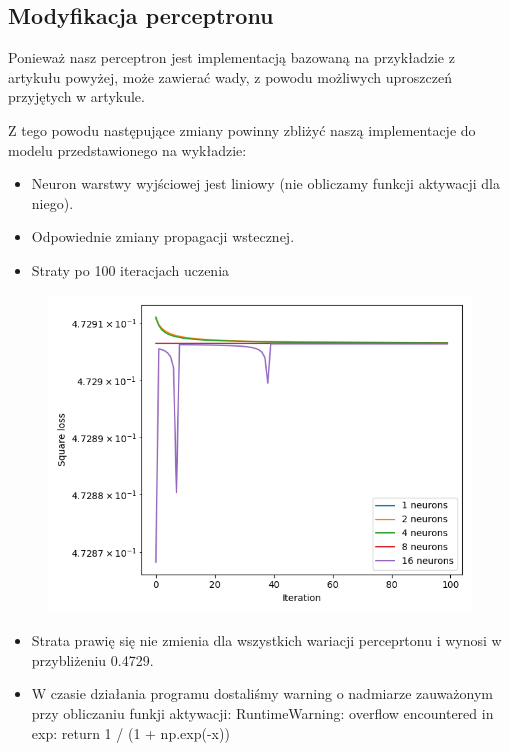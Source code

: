 \documentclass[12pt,a4paper]{article}
\begin{document}
\pagebreak

\subsection{Modyfikacja perceptronu}

Ponieważ nasz perceptron jest implementacją bazowaną na przykładzie z artykułu powyżej, może zawierać wady, z powodu możliwych uproszczeń przyjętych w artykule.

Z tego powodu następujące zmiany powinny zbliżyć naszą implementacje do modelu przedstawionego na wykładzie:

\begin{itemize}
  \item   Neuron warstwy wyjściowej jest liniowy (nie obliczamy funkcji aktywacji dla niego).
  \item   Odpowiednie zmiany propagacji wstecznej.
\end{itemize}

\begin{itemize}
  \item   Straty po 100 iteracjach uczenia
\end{itemize}

\begin{figure}[h]
  \centering
  \includegraphics[width=1.0\textwidth]{charts/no_output_activation/noactiv100iter_lr1.png}
  \caption{}
  \label{}
\end{figure}

\begin{itemize}
  \item   Strata prawię się nie zmienia dla wszystkich wariacji perceprtonu i wynosi w przybliżeniu 0.4729.
  \item   W czasie działania programu dostaliśmy warning o nadmiarze zauważonym przy obliczaniu funkji aktywacji: 
RuntimeWarning: overflow encountered in exp: return 1 / (1 + np.exp(-x))
\end{itemize}
\end{document}
